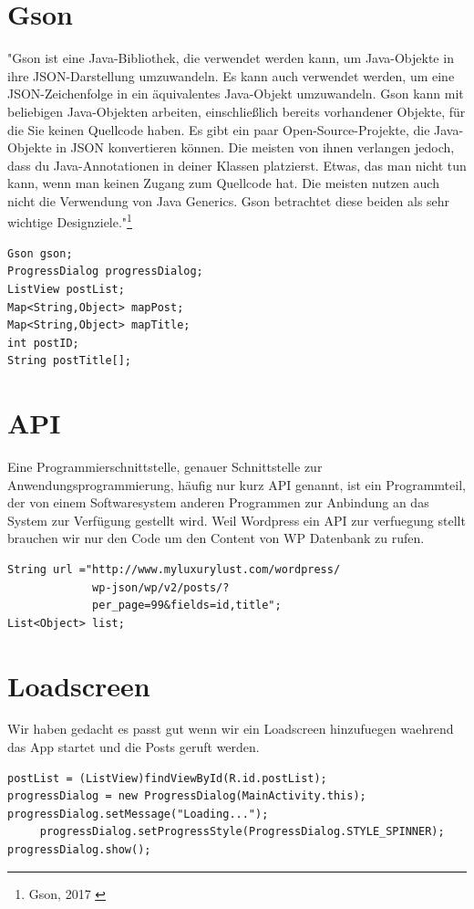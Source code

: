 \section{Gson}
"Gson ist eine Java-Bibliothek, die verwendet werden kann, um Java-Objekte in ihre JSON-Darstellung umzuwandeln. Es kann auch verwendet werden, um eine JSON-Zeichenfolge in ein äquivalentes Java-Objekt umzuwandeln. Gson kann mit beliebigen Java-Objekten arbeiten, einschließlich bereits vorhandener Objekte, für die Sie keinen Quellcode haben. Es gibt ein paar Open-Source-Projekte, die Java-Objekte in JSON konvertieren können. Die meisten von ihnen verlangen jedoch, dass du Java-Annotationen in deiner Klassen platzierst. Etwas, das man nicht tun kann, wenn man keinen Zugang zum Quellcode hat. Die meisten nutzen auch nicht die Verwendung von Java Generics. Gson betrachtet diese beiden als sehr wichtige Designziele."\footnote{Gson, 2017 \cite{Gson2017}}

\begin{verbatim}
Gson gson;
ProgressDialog progressDialog;
ListView postList;
Map<String,Object> mapPost;
Map<String,Object> mapTitle;
int postID;
String postTitle[];
\end{verbatim}

\section{API}
Eine Programmierschnittstelle, genauer Schnittstelle zur Anwendungsprogrammierung, häufig nur kurz API genannt, ist ein Programmteil, der von einem Softwaresystem anderen Programmen zur Anbindung an das System zur Verfügung gestellt wird.
Weil Wordpress ein API zur verfuegung stellt brauchen wir nur den Code um den Content von WP Datenbank zu rufen.

\begin{verbatim}
String url ="http://www.myluxurylust.com/wordpress/
			 wp-json/wp/v2/posts/?	
			 per_page=99&fields=id,title";
List<Object> list;
\end{verbatim}


\section{Loadscreen}
Wir haben gedacht es passt gut wenn wir ein Loadscreen hinzufuegen waehrend das App startet und die Posts geruft werden.

\begin{verbatim}
postList = (ListView)findViewById(R.id.postList);
progressDialog = new ProgressDialog(MainActivity.this);
progressDialog.setMessage("Loading...");
     progressDialog.setProgressStyle(ProgressDialog.STYLE_SPINNER);
progressDialog.show();
\end{verbatim}

